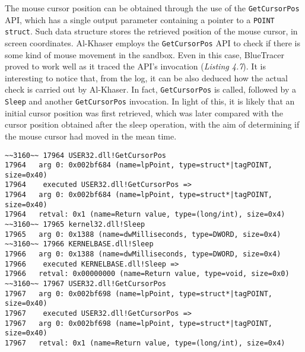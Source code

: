 The mouse cursor position can be obtained through the use of the \texttt{GetCursorPos} API, which has a single output parameter containing a pointer to a \texttt{POINT struct}. Such data structure stores the retrieved position of the mouse cursor, in screen coordinates. Al-Khaser employs the \texttt{GetCursorPos} API to check if there is some kind of mouse movement in the sandbox. Even in this case, BlueTracer proved to work well as it traced the API's invocation (\textit{Listing 4.7}). It is interesting to notice that, from the log, it can be also deduced how the actual check is carried out by Al-Khaser. In fact, \texttt{GetCursorPos} is called, followed by a \texttt{Sleep} and another \texttt{GetCursorPos} invocation. In light of this, it is likely that an initial cursor position was first retrieved, which was later compared with the cursor position obtained after the sleep operation, with the aim of determining if the mouse cursor had moved in the mean time.

\vspace{0.5cm}
\begin{lstlisting}[caption={\texttt{GetCursorPos} evidence in the log },captionpos=b]
~~3160~~ 17964 USER32.dll!GetCursorPos
17964 	arg 0: 0x002bf684 (name=lpPoint, type=struct*|tagPOINT, size=0x40)
17964    executed USER32.dll!GetCursorPos =>
17964 	arg 0: 0x002bf684 (name=lpPoint, type=struct*|tagPOINT, size=0x40)
17964 	retval: 0x1 (name=Return value, type=(long/int), size=0x4)
~~3160~~ 17965 kernel32.dll!Sleep
17965 	arg 0: 0x1388 (name=dwMilliseconds, type=DWORD, size=0x4)
~~3160~~ 17966 KERNELBASE.dll!Sleep
17966 	arg 0: 0x1388 (name=dwMilliseconds, type=DWORD, size=0x4)
17966    executed KERNELBASE.dll!Sleep =>
17966 	retval: 0x00000000 (name=Return value, type=void, size=0x0)
~~3160~~ 17967 USER32.dll!GetCursorPos
17967 	arg 0: 0x002bf698 (name=lpPoint, type=struct*|tagPOINT, size=0x40)
17967    executed USER32.dll!GetCursorPos =>
17967 	arg 0: 0x002bf698 (name=lpPoint, type=struct*|tagPOINT, size=0x40)
17967 	retval: 0x1 (name=Return value, type=(long/int), size=0x4)
\end{lstlisting}

